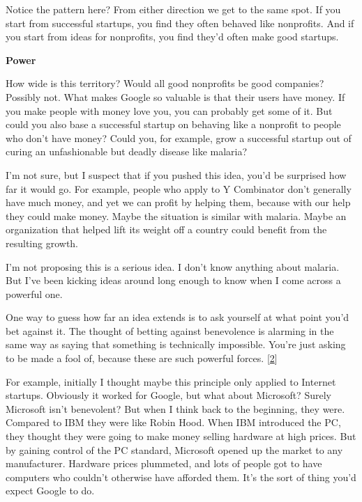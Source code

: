 Notice the pattern here? From either
                  direction we get to the same spot. If you start from
                  successful startups, you find they often behaved like
                  nonprofits. And if you start from ideas for nonprofits, you
                  find they'd often make good startups.

\textbf{Power}

How wide is this territory? Would all good
                  nonprofits be good companies? Possibly not. What makes Google
                  so valuable is that their users have money. If you make people
                  with money love you, you can probably get some of it. But
                  could you also base a successful startup on behaving like a
                  nonprofit to people who don't have money? Could you, for
                  example, grow a successful startup out of curing an
                  unfashionable but deadly disease like malaria?

I'm
                  not sure, but I suspect that if you pushed this idea, you'd be
                  surprised how far it would go. For example, people who apply
                  to Y Combinator don't generally have much money, and yet we
                  can profit by helping them, because with our help they could
                  make money. Maybe the situation is similar with malaria. Maybe
                  an organization that helped lift its weight off a country
                  could benefit from the resulting growth.

I'm not
                  proposing this is a serious idea. I don't know anything about
                  malaria. But I've been kicking ideas around long enough to
                  know when I come across a powerful one.

One way to
                  guess how far an idea extends is to ask yourself at what point
                  you'd bet against it. The thought of betting against
                  benevolence is alarming in the same way as saying that
                  something is technically impossible. You're just asking to be
                  made a fool of, because these are such powerful forces.
                  [\href{\#f2n}{2}]

For example, initially I thought maybe this
                  principle only applied to Internet startups. Obviously it
                  worked for Google, but what about Microsoft? Surely Microsoft
                  isn't benevolent? But when I think back to the beginning, they
                  were. Compared to IBM they were like Robin Hood. When IBM
                  introduced the PC, they thought they were going to make money
                  selling hardware at high prices. But by gaining control of the
                  PC standard, Microsoft opened up the market to any
                  manufacturer. Hardware prices plummeted, and lots of people
                  got to have computers who couldn't otherwise have afforded
                  them. It's the sort of thing you'd expect Google to do.

